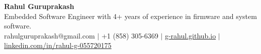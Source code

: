 \documentclass[10pt,letterpaper]{article}
\begin{document}
\begin{center}
  {\LARGE\bfseries Rahul Guruprakash}\\[3pt]
  {\normalsize Embedded Software Engineer with 4+ years of experience in firmware and system software.}\\[2pt]
  rahulguruprakash@gmail.com $\mid$ +1 (858) 305-6369 $\mid$
  \href{https://g-rahul.github.io}{g-rahul.github.io} $\mid$
  \href{https://linkedin.com/in/rahul-g-055720175}{linkedin.com/in/rahul-g-055720175}
\end{center}





\end{document}
